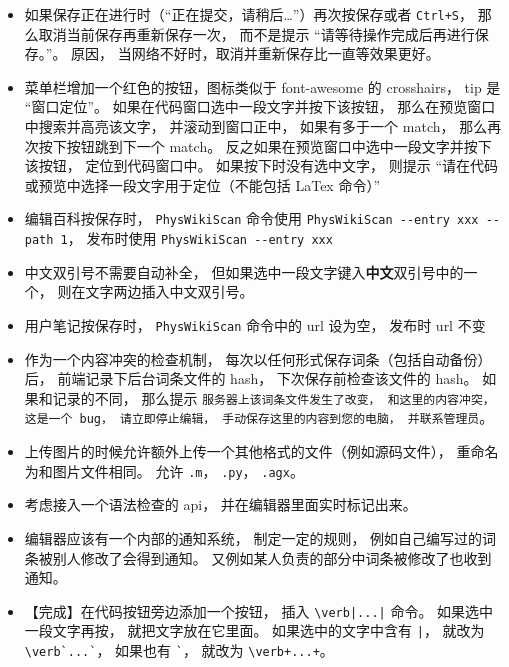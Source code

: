 \begin{itemize}
\item 如果保存正在进行时（“正在提交，请稍后…”）再次按保存或者 \verb|Ctrl+S|， 那么取消当前保存再重新保存一次， 而不是提示 “请等待操作完成后再进行保存。”。 原因， 当网络不好时，取消并重新保存比一直等效果更好。

\item 菜单栏增加一个红色的按钮，图标类似于 font-awesome 的 crosshairs， tip 是 “窗口定位”。 如果在代码窗口选中一段文字并按下该按钮， 那么在预览窗口中搜索并高亮该文字， 并滚动到窗口正中， 如果有多于一个 match， 那么再次按下按钮跳到下一个 match。 反之如果在预览窗口中选中一段文字并按下该按钮， 定位到代码窗口中。 如果按下时没有选中文字， 则提示 “请在代码或预览中选择一段文字用于定位（不能包括 LaTex 命令）”

\item 编辑百科按保存时， \verb|PhysWikiScan| 命令使用 \verb|PhysWikiScan --entry xxx --path 1|， 发布时使用 \verb|PhysWikiScan --entry xxx|

\item 中文双引号不需要自动补全， 但如果选中一段文字键入\textbf{中文}双引号中的一个， 则在文字两边插入中文双引号。

\item 用户笔记按保存时， \verb|PhysWikiScan| 命令中的 url 设为空， 发布时 url 不变

\item 作为一个内容冲突的检查机制， 每次以任何形式保存词条（包括自动备份）后， 前端记录下后台词条文件的 hash， 下次保存前检查该文件的 hash。 如果和记录的不同， 那么提示 \verb|服务器上该词条文件发生了改变， 和这里的内容冲突， 这是一个 bug， 请立即停止编辑， 手动保存这里的内容到您的电脑， 并联系管理员|。

\item 上传图片的时候允许额外上传一个其他格式的文件（例如源码文件）， 重命名为和图片文件相同。 允许 \verb|.m|， \verb|.py|， \verb|.agx|。

\item 考虑接入一个语法检查的 api， 并在编辑器里面实时标记出来。

\item 编辑器应该有一个内部的通知系统， 制定一定的规则， 例如自己编写过的词条被别人修改了会得到通知。 又例如某人负责的部分中词条被修改了也收到通知。

\item 【完成】在代码按钮旁边添加一个按钮， 插入 \verb`\verb|...|` 命令。 如果选中一段文字再按， 就把文字放在它里面。 如果选中的文字中含有 \verb`|`， 就改为 \verb|\verb`...`|， 如果也有 \verb|`|， 就改为 \verb|\verb+...+|。


\end{itemize}
